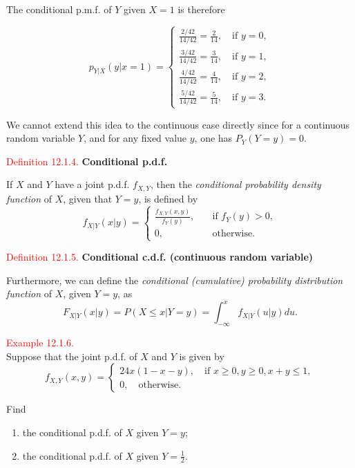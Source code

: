 \documentclass[
]{book}
\providecommand{\tightlist}{%
  \setlength{\itemsep}{0pt}\setlength{\parskip}{0pt}}
\begin{document}
The conditional p.m.f. of \(Y\) given \(X=1\) is therefore

\[p_{Y|X}(y|x=1) = \begin{cases}
\frac{2/42}{14/42} = \frac{2}{14}, \quad \text{if } y=0, \\
\frac{3/42}{14/42} = \frac{3}{14}, \quad \text{if } y=1, \\
\frac{4/42}{14/42} = \frac{4}{14}, \quad \text{if } y=2, \\
\frac{5/42}{14/42} = \frac{5}{14}, \quad \text{if } y=3. \end{cases}\]

We cannot extend this idea to the continuous case directly since for a continuous random variable \(Y\), and for any fixed value \(y\), one has \(P_Y(Y=y)=0\).

\leavevmode{}%
\textcolor{red}{Definition 12.1.4.}
{\textbf{Conditional p.d.f.}}

If \(X\) and \(Y\) have a joint p.d.f. \(f_{X,Y}\), then the \emph{conditional probability density function} of \(X\), given that \(Y=y\), is defined by\\

\[f_{X|Y}(x|y) = \left\{ \begin{array}{ll} \frac{f_{X,Y}(x,y)}{f_Y(y)}, \quad &\text{if } f_Y(y)>0, \\[5pt]
0, \quad &\text{otherwise.} \end{array} \right.\]

\leavevmode{}%
\textcolor{red}{Definition 12.1.5.}
{\textbf{Conditional c.d.f. (continuous random variable)}}

Furthermore, we can define the \emph{conditional (cumulative) probability distribution function} of \(X\), given \(Y=y\), as
\[ F_{X|Y}(x|y) = P(X \leq x|Y=y) = \int_{-\infty}^x f_{X|Y}(u|y)du.\]

\hypertarget{CondDis:ex:cond_pdf}{}
\textcolor{red}{Example 12.1.6.}\\
Suppose that the joint p.d.f. of \(X\) and \(Y\) is given by\\

\[ f_{X,Y}(x,y) = \begin{cases} 24x(1-x-y), \quad \text{if } x \geq 0, y \geq 0, x+y \leq 1, \\[5pt]
0, \quad \text{otherwise.} \end{cases}\]

Find

\begin{enumerate}
\def\labelenumi{(\alph{enumi})}
\tightlist
\item
  the conditional p.d.f. of \(X\) given \(Y=y\);\\
\item
  the conditional p.d.f. of \(X\) given \(Y=\frac{1}{2}\).\\
\end{enumerate}
\end{document}
